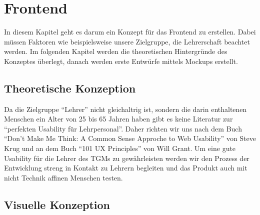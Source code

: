 \section{Frontend}
In diesem Kapitel geht es darum ein Konzept für das Frontend zu erstellen. Dabei müssen Faktoren wie beispielsweise unsere Zielgruppe, die Lehrerschaft beachtet werden. Im folgenden Kapitel werden die theoretischen Hintergründe des Konzeptes überlegt, danach werden erste Entwürfe mittels Mockups erstellt. 
\subsection{Theoretische Konzeption}
Da die Zielgruppe \enquote{Lehrer} nicht gleichaltrig ist, sondern die darin enthaltenen Menschen ein Alter von 25 bis 65 Jahren haben gibt es keine Literatur zur \enquote{perfekten Usability für Lehrpersonal}. Daher richten wir uns nach dem Buch \enquote{Don't Make Me Think: A Common Sense Approche to Web Usability} von Steve Krug und an dem Buch \enquote{101 UX Principles} von Will Grant. Um eine gute Usability für die Lehrer des TGMs zu gewährleisten werden wir den Prozess der Entwicklung streng in Kontakt zu Lehrern begleiten und das Produkt auch mit nicht Technik affinen Menschen testen.  
\newpage
\subsection{Visuelle Konzeption}

